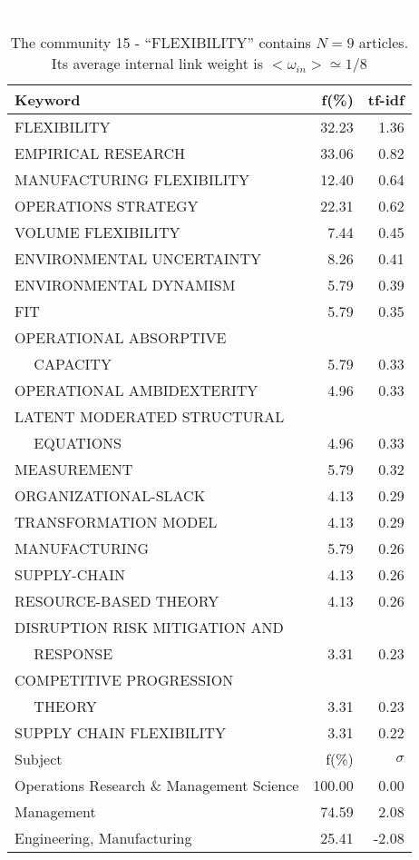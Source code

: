 \documentclass[a4paper,11pt]{report}
\begin{document}
\begin{landscape}
\clearpage

\begin{table}[!ht]
\caption{The community 15 - ``FLEXIBILITY'' contains $N = 9$ articles. Its average internal link weight is $<\omega_{in}> \simeq 1/8$ }
\textcolor{white}{aa}\\
{\scriptsize\begin{tabular}{|l r  r|}
\hline
Keyword & f(\%) & tf-idf \\
\hline
FLEXIBILITY & 32.23 & 1.36\\
EMPIRICAL RESEARCH & 33.06 & 0.82\\
MANUFACTURING FLEXIBILITY & 12.40 & 0.64\\
OPERATIONS STRATEGY & 22.31 & 0.62\\
VOLUME FLEXIBILITY & 7.44 & 0.45\\
ENVIRONMENTAL UNCERTAINTY & 8.26 & 0.41\\
ENVIRONMENTAL DYNAMISM & 5.79 & 0.39\\
FIT & 5.79 & 0.35\\
OPERATIONAL ABSORPTIVE &  &\\
$\quad$ CAPACITY & 5.79 & 0.33\\
OPERATIONAL AMBIDEXTERITY & 4.96 & 0.33\\
LATENT MODERATED STRUCTURAL &  &\\
$\quad$ EQUATIONS & 4.96 & 0.33\\
MEASUREMENT & 5.79 & 0.32\\
ORGANIZATIONAL-SLACK & 4.13 & 0.29\\
TRANSFORMATION MODEL & 4.13 & 0.29\\
MANUFACTURING & 5.79 & 0.26\\
SUPPLY-CHAIN & 4.13 & 0.26\\
RESOURCE-BASED THEORY & 4.13 & 0.26\\
DISRUPTION RISK MITIGATION AND &  &\\
$\quad$ RESPONSE & 3.31 & 0.23\\
COMPETITIVE PROGRESSION &  &\\
$\quad$ THEORY & 3.31 & 0.23\\
SUPPLY CHAIN FLEXIBILITY & 3.31 & 0.22\\
\hline
\hline
Subject & f(\%) & $\sigma$\\
\hline
Operations Research \& Management Science & 100.00 & 0.00\\
Management & 74.59 & 2.08\\
Engineering, Manufacturing & 25.41 & -2.08\\

\end{tabular}}
\end{table}
\end{landscape}
\end{document}
